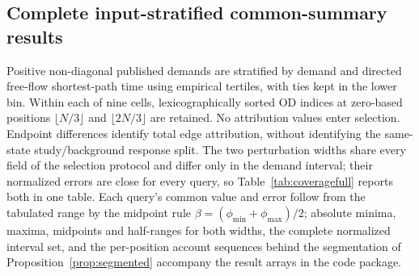 \subsection{Complete input-stratified common-summary results}\label{sec:coverage}
Positive non-diagonal published demands are stratified by demand and directed free-flow shortest-path time using empirical tertiles, with ties kept in the lower bin. Within each of nine cells, lexicographically sorted OD indices at zero-based positions $\lfloor N/3\rfloor$ and $\lfloor2N/3\rfloor$ are retained. No attribution values enter selection. Endpoint differences identify total edge attribution, without identifying the same-state study/background response split. The two perturbation widths share every field of the selection protocol and differ only in the demand interval; their normalized errors are close for every query, so Table~\ref{tab:coveragefull} reports both in one table. Each query's common value and error follow from the tabulated range by the midpoint rule $\beta=(\phi_{\min}+\phi_{\max})/2$; absolute minima, maxima, midpoints and half-ranges for both widths, the complete normalized interval set, and the per-position account sequences behind the segmentation of Proposition~\ref{prop:segmented} accompany the result arrays in the code package.
